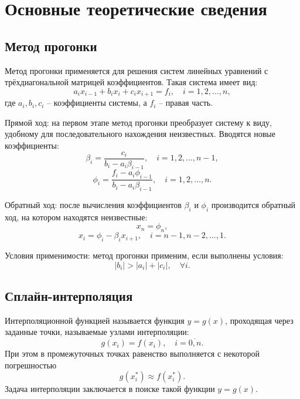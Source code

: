 \documentclass[a4paper, 14pt]{extarticle}
\begin{document}
\section{Основные теоретические сведения}

\subsection{Метод прогонки}
Метод прогонки применяется для решения систем линейных уравнений с трёхдиагональной матрицей коэффициентов. Такая система имеет вид:
\begin{equation}
    a_i x_{i-1} + b_i x_i + c_i x_{i+1} = f_i, \quad i = 1, 2, \dots, n,
\end{equation}
где $a_i, b_i, c_i$ – коэффициенты системы, а $f_i$ – правая часть.

Прямой ход:
на первом этапе метод прогонки преобразует систему к виду, удобному для последовательного нахождения неизвестных. Вводятся новые коэффициенты:
\begin{equation}
    \beta_i = \frac{c_i}{b_i - a_i \beta_{i-1}}, \quad i = 1, 2, \dots, n-1,
\end{equation}
\begin{equation}
    \phi_i = \frac{f_i - a_i \phi_{i-1}}{b_i - a_i \beta_{i-1}}, \quad i = 1, 2, \dots, n.
\end{equation}

Обратный ход:
после вычисления коэффициентов $\beta_i$ и $\phi_i$ производится обратный ход, на котором находятся неизвестные:
\begin{equation}
    x_n = \phi_n,
\end{equation}
\begin{equation}
    x_i = \phi_i - \beta_i x_{i+1}, \quad i = n-1, n-2, \dots, 1.
\end{equation}

Условия применимости:
метод прогонки применим, если выполнены условия:
\begin{equation}
    |b_i| > |a_i| + |c_i|, \quad \forall i.
\end{equation}

\subsection{Сплайн-интерполяция}
Интерполяционной функцией называется функция \( y = g(x) \), проходящая через заданные точки, называемые узлами интерполяции:  
\[
g(x_i) = f(x_i), \quad i = \overline{0, n}.
\]  
При этом в промежуточных точках равенство выполняется с некоторой погрешностью  
\[
g(x_i^*) \approx f(x_i^*).
\]  
Задача интерполяции заключается в поиске такой функции \( y = g(x) \).
\end{document}
